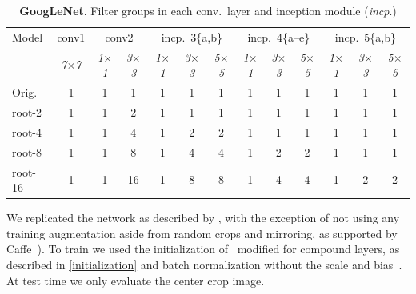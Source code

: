 \documentclass[thesis]{subfiles}
\begin{document}
	\begin{table}[tp]
		\caption[GoogLeNet root architectures]{\textbf{GoogLeNet}. Filter groups in each conv.\ layer and \Gls{inception} module (\textit{incp}.)}
		\label{table:googlenetconfig}
		\centering
		\begin{tabular}{@{}lcccccccccccc@{}}
			\toprule
			Model & conv1 & \multicolumn{2}{c}{conv2} & \multicolumn{3}{c}{incp.~3\{a,b\}} & \multicolumn{3}{c}{incp.~4\{a--e\}} & \multicolumn{3}{c}{incp.~5\{a,b\}} \\
			& \textit{\footnotesize7$\times$7} & \textit{\footnotesize1$\times$1} & \textit{\footnotesize3$\times$3} & \textit{\footnotesize1$\times$1} & \textit{\footnotesize3$\times$3} & \textit{\footnotesize5$\times$5} & \textit{\footnotesize1$\times$1} & \textit{\footnotesize3$\times$3} & \textit{\footnotesize5$\times$5} & \textit{\footnotesize1$\times$1} & \textit{\footnotesize3$\times$3} & \textit{\footnotesize5$\times$5} \\
			Orig. & 1 &  1 &  1 & 1 & 1 & 1 & 1 & 1 & 1 & 1 & 1 & 1\\ 
			\midrule
			root-2 & 1 &  1 &  2 & 1 & 1 & 1 & 1 & 1 & 1 & 1 & 1 & 1\\
			root-4 & 1 &  1 &  4 & 1 & 2 & 2 & 1 & 1 & 1 & 1 & 1 & 1\\
			root-8 & 1 &  1 &  8 & 1 & 4 & 4 & 1 & 2 & 2 & 1 & 1 & 1\\
			root-16 & 1 &  1 & 16 & 1 & 8 & 8 & 1 & 4 & 4 & 1 & 2 & 2\\
			\bottomrule
		\end{tabular}
	\end{table}
	
	We replicated the network as described by \citet{Szegedy2014going}, with the exception of not using any training augmentation aside from random crops and mirroring, as supported by Caffe~\citep{Jia2014}). To train we used the initialization of~\citep{He2015b} modified for compound layers, as described in \cref{initialization} and batch normalization without the scale and bias~\citep{Ioffe2015}. At test time we only evaluate the center crop image.
	
\end{document}

